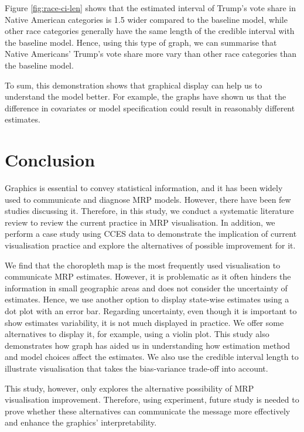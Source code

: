 \documentclass{monashthesis}
\begin{document}
Figure \ref{fig:race-ci-len} shows that the estimated interval of Trump's vote share in Native American categories is 1.5 wider compared to the baseline model, while other race categories generally have the same length of the credible interval with the baseline model. Hence, using this type of graph, we can summarise that Native Americans' Trump's vote share more vary than other race categories than the baseline model.

To sum, this demonstration shows that graphical display can help us to understand the model better. For example, the graphs have shown us that the difference in covariates or model specification could result in reasonably different estimates.

\hypertarget{ch:conclusion}{%
\chapter{Conclusion}\label{ch:conclusion}}

Graphics is essential to convey statistical information, and it has been widely used to communicate and diagnose MRP models. However, there have been few studies discussing it. Therefore, in this study, we conduct a systematic literature review to review the current practice in MRP visualisation. In addition, we perform a case study using CCES data to demonstrate the implication of current visualisation practice and explore the alternatives of possible improvement for it.

We find that the choropleth map is the most frequently used visualisation to communicate MRP estimates. However, it is problematic as it often hinders the information in small geographic areas and does not consider the uncertainty of estimates. Hence, we use another option to display state-wise estimates using a dot plot with an error bar. Regarding uncertainty, even though it is important to show estimates variability, it is not much displayed in practice. We offer some alternatives to display it, for example, using a violin plot. This study also demonstrates how graph has aided us in understanding how estimation method and model choices affect the estimates. We also use the credible interval length to illustrate visualisation that takes the bias-variance trade-off into account.

This study, however, only explores the alternative possibility of MRP visualisation improvement. Therefore, using experiment, future study is needed to prove whether these alternatives can communicate the message more effectively and enhance the graphics' interpretability.
\end{document}
